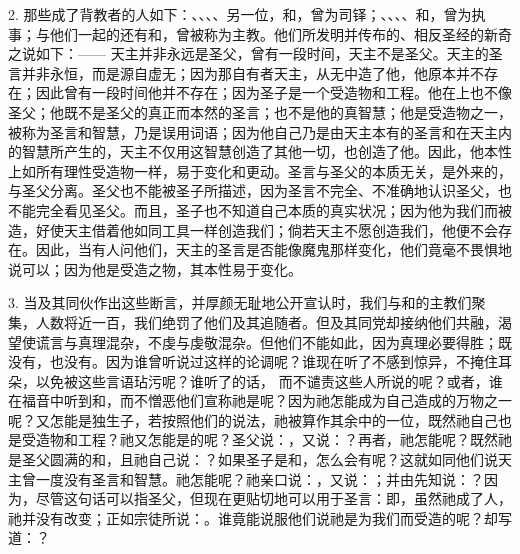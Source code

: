 2. 那些成了背教者的人如下：、、、、另一位，和，曾为司铎；、、、、和，曾为执事；与他们一起的还有和，曾被称为主教。他们所发明并传布的、相反圣经的新奇之说如下：—— 天主并非永远是圣父，曾有一段时间，天主不是圣父。天主的圣言并非永恒，而是源自虚无；因为那自有者天主，从无中造了他，他原本并不存在；因此曾有一段时间他并不存在；因为圣子是一个受造物和工程。他在上也不像圣父；他既不是圣父的真正而本然的圣言；也不是他的真智慧；他是受造物之一，被称为圣言和智慧，乃是误用词语；因为他自己乃是由天主本有的圣言和在天主内的智慧所产生的，天主不仅用这智慧创造了其他一切，也创造了他。因此，他本性上如所有理性受造物一样，易于变化和更动。圣言与圣父的本质无关，是外来的，与圣父分离。圣父也不能被圣子所描述，因为圣言不完全、不准确地认识圣父，也不能完全看见圣父。而且，圣子也不知道自己本质的真实状况；因为他为我们而被造，好使天主借着他如同工具一样创造我们；倘若天主不愿创造我们，他便不会存在。因此，当有人问他们，天主的圣言是否能像魔鬼那样变化，他们竟毫不畏惧地说可以；因为他是受造之物，其本性易于变化。\par

3. 当及其同伙作出这些断言，并厚颜无耻地公开宣认时，我们与和的主教们聚集，人数将近一百，我们绝罚了他们及其追随者。但及其同党却接纳他们共融，渴望使谎言与真理混杂，不虔与虔敬混杂。但他们不能如此，因为真理必要得胜；既没有，也没有。因为谁曾听说过这样的论调呢？谁现在听了不感到惊异，不掩住耳朵，以免被这些言语玷污呢？谁听了的话， 而不谴责这些人所说的呢？或者，谁在福音中听到和，而不憎恶他们宣称祂是呢？因为祂怎能成为自己造成的万物之一呢？又怎能是独生子，若按照他们的说法，祂被算作其余中的一位，既然祂自己也是受造物和工程？祂又怎能是的呢？圣父说：，又说：？再者，祂怎能呢？既然祂是圣父圆满的和，且祂自己说：？如果圣子是和，怎么会有呢？这就如同他们说天主曾一度没有圣言和智慧。祂怎能呢？祂亲口说：，又说：；并由先知说：？因为，尽管这句话可以指圣父，但现在更贴切地可以用于圣言：即，虽然祂成了人，祂并没有改变；正如宗徒所说：。谁竟能说服他们说祂是为我们而受造的呢？却写道：？\par

